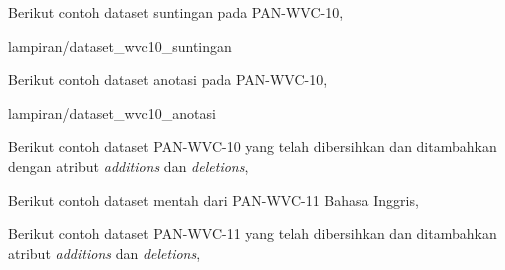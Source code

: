 \vspace*{\fill}
\begin{center}
	\begin{minipage}{\textwidth}
		\centering
		\textbf{\Large\tUpLampiran}
	\end{minipage}
\end{center}
\vfill



	\label{lampiran:dataset}

	\label{lampiran:dataset_wvc10_suntingan}

Berikut contoh dataset suntingan pada PAN-WVC-10,


	{lampiran/dataset_wvc10_suntingan}

	\label{lampiran:dataset_wvc10_anotasi}

Berikut contoh dataset anotasi pada PAN-WVC-10,


	{lampiran/dataset_wvc10_anotasi}

	\label{lampiran:dataset_wvc10_gabungan}

Berikut contoh dataset PAN-WVC-10 yang telah dibersihkan dan ditambahkan dengan
atribut \textit{additions} dan \textit{deletions},



	\label{lampiran:dataset_wvc11_mentah}

Berikut contoh dataset mentah dari PAN-WVC-11 Bahasa Inggris,



	\label{lampiran:dataset_wvc11_gabungan}

Berikut contoh dataset PAN-WVC-11 yang telah dibersihkan dan ditambahkan
atribut \textit{additions} dan \textit{deletions},


